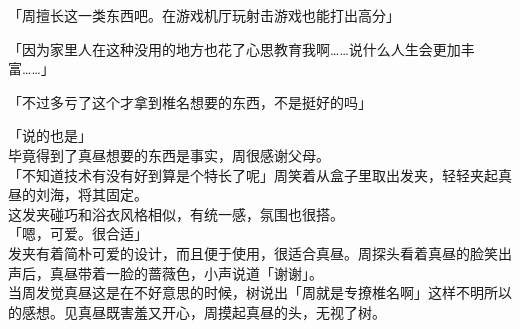 「周擅长这一类东西吧。在游戏机厅玩射击游戏也能打出高分」

「因为家里人在这种没用的地方也花了心思教育我啊……说什么人生会更加丰富……」

「不过多亏了这个才拿到椎名想要的东西，不是挺好的吗」

「说的也是」\\

毕竟得到了真昼想要的东西是事实，周很感谢父母。\\

「不知道技术有没有好到算是个特长了呢」周笑着从盒子里取出发夹，轻轻夹起真昼的刘海，将其固定。\\

这发夹碰巧和浴衣风格相似，有统一感，氛围也很搭。\\

「嗯，可爱。很合适」\\

发夹有着简朴可爱的设计，而且便于使用，很适合真昼。周探头看着真昼的脸笑出声后，真昼带着一脸的蔷薇色，小声说道「谢谢」。\\

当周发觉真昼这是在不好意思的时候，树说出「周就是专撩椎名啊」这样不明所以的感想。见真昼既害羞又开心，周摸起真昼的头，无视了树。
